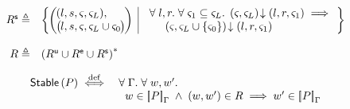 \begin{definition}[Rely]
\[\begin{array}{r l}
	
	\shiftR \eqdef & 
	\left\{
 	\hspace*{-0.2cm}
	 \begin{array}{l | r}
	   \left(
	   \hspace*{-0.2cm}
	   \begin{array}{l}
	     (l, s, \amod{}, \amod{L}),\\
 	     \left(
	     \hspace*{-0.2cm}
	     \begin{array}{l}
	      l,
	      s,
	      \amod{}, \amod{L} \cup \amod{0}
	     \end{array}
 	    \hspace*{-0.2cm}
 	    \right)
	   \end{array}
	   \hspace*{-0.2cm}
 	  \right)
	   &
 	  \begin{array}{l}
 	  	\for{l, r} \for{\amod{1} \subseteq \amod{L}} \extendsAM{\amod{}, \amod{L}}{l}{r}{\amod{1}} \implies \\
 	  	\hspace*{0.5cm}\extendsAM{\amod{}, \amod{L} \cup \{\amod{0}\}}{l}{r}{\amod{1}}
			
   	\end{array}
 	\end{array}
 	\hspace*{-0.2cm}
	\right\}\\\\
	
	\rely \eqdef & \left(\updateR \cup \extendR \cup \shiftR \right)^{*}
\end{array}
\]
%
\end{definition}
%
%
\begin{definition}[Stability]
\[	
\begin{array}{r l}
	\stable{P} \iffdef &
	\for{\lenv}\for{w, w'} \\
	& \hspace*{0.2cm} w \in \sem[\lenv]{P} \;\land\; (w, w') \in \rely \implies
	 w' \in \sem[\lenv]{P}
\end{array}
\]
\end{definition}

